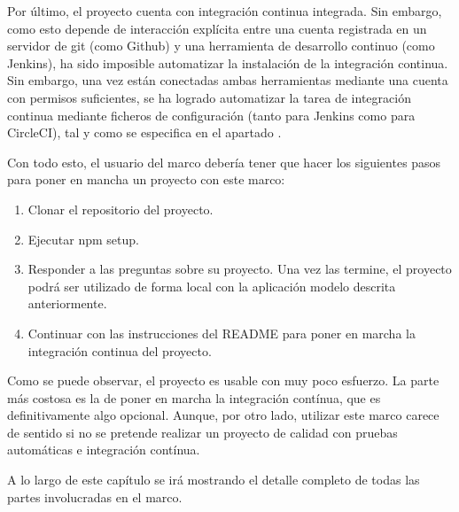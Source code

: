 Por último, el proyecto cuenta con integración continua integrada. Sin embargo, como esto depende de interacción explícita entre una cuenta registrada en un servidor de git (como Github) y una herramienta de desarrollo continuo (como Jenkins), ha sido imposible automatizar la instalación de la integración continua. Sin embargo, una vez están conectadas ambas herramientas mediante una cuenta con permisos suficientes, se ha logrado automatizar la tarea de integración continua mediante ficheros de configuración (tanto para Jenkins como para CircleCI), tal y como se especifica en el apartado .

Con todo esto, el usuario del marco debería tener que hacer los siguientes pasos para poner en mancha un proyecto con este marco:
\begin{enumerate}
\item Clonar el repositorio del proyecto.
\item Ejecutar npm setup.
\item Responder a las preguntas sobre su proyecto. Una vez las termine, el proyecto podrá ser utilizado de forma local con la aplicación modelo descrita anteriormente.
\item Continuar con las instrucciones del README para poner en marcha la integración continua del proyecto.
\end{enumerate}

Como se puede observar, el proyecto es usable con muy poco esfuerzo. La parte más costosa es la de poner en marcha la integración contínua, que es definitivamente algo opcional. Aunque, por otro lado, utilizar este marco carece de sentido si no se pretende realizar un proyecto de calidad con pruebas automáticas e integración contínua.

A lo largo de este capítulo se irá mostrando el detalle completo de todas las partes involucradas en el marco.
